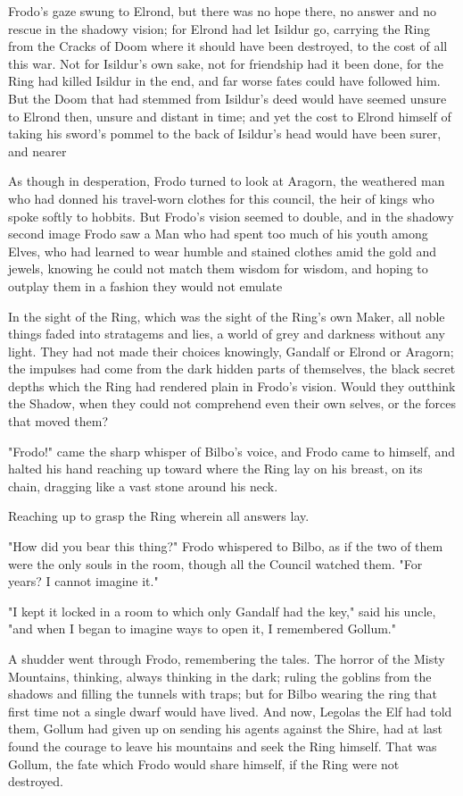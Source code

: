 Frodo's gaze swung to Elrond, but there was no hope there, no answer and no
rescue in the shadowy vision; for Elrond had let Isildur go, carrying the Ring
from the Cracks of Doom where it should have been destroyed, to the cost of all
this war. Not for Isildur's own sake, not for friendship had it been done, for
the Ring had killed Isildur in the end, and far worse fates could have followed
him. But the Doom that had stemmed from Isildur's deed would have seemed unsure
to Elrond then, unsure and distant in time; and yet the cost to Elrond himself
of taking his sword's pommel to the back of Isildur's head would have been
surer, and nearer{\el}

As though in desperation, Frodo turned to look at Aragorn, the weathered man
who had donned his travel-worn clothes for this council, the heir of kings who
spoke softly to hobbits. But Frodo's vision seemed to double, and in the
shadowy second image Frodo saw a Man who had spent too much of his youth among
Elves, who had learned to wear humble and stained clothes amid the gold and
jewels, knowing he could not match them wisdom for wisdom, and hoping to
outplay them in a fashion they would not emulate{\el}

In the sight of the Ring, which was the sight of the Ring's own Maker, all
noble things faded into stratagems and lies, a world of grey and darkness
without any light. They had not made their choices knowingly, Gandalf or Elrond
or Aragorn; the impulses had come from the dark hidden parts of themselves, the
black secret depths which the Ring had rendered plain in Frodo's vision. Would
they outthink the Shadow, when they could not comprehend even their own selves,
or the forces that moved them?

"Frodo!" came the sharp whisper of Bilbo's voice, and Frodo came to himself,
and halted his hand reaching up toward where the Ring lay on his breast, on its
chain, dragging like a vast stone around his neck.

Reaching up to grasp the Ring wherein all answers lay.

"How did you bear this thing?" Frodo whispered to Bilbo, as if the two of them
were the only souls in the room, though all the Council watched them. "For
years? I cannot imagine it."

"I kept it locked in a room to which only Gandalf had the key," said his uncle,
"and when I began to imagine ways to open it, I remembered Gollum."

A shudder went through Frodo, remembering the tales. The horror of the Misty
Mountains, thinking, always thinking in the dark; ruling the goblins from the
shadows and filling the tunnels with traps; but for Bilbo wearing the ring that
first time not a single dwarf would have lived. And now, Legolas the Elf had
told them, Gollum had given up on sending his agents against the Shire, had at
last found the courage to leave his mountains and seek the Ring himself. That
was Gollum, the fate which Frodo would share himself, if the Ring were not
destroyed.


